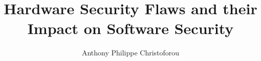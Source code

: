 \documentclass{template}
\begin{document}

\title{\huge{Hardware Security Flaws and their Impact on Software Security}}
\author{Anthony Philippe Christoforou}


\lstlistoflistings  






\footnotesize  %
\printbibliography
\normalsize
\appendix
\end{document}
